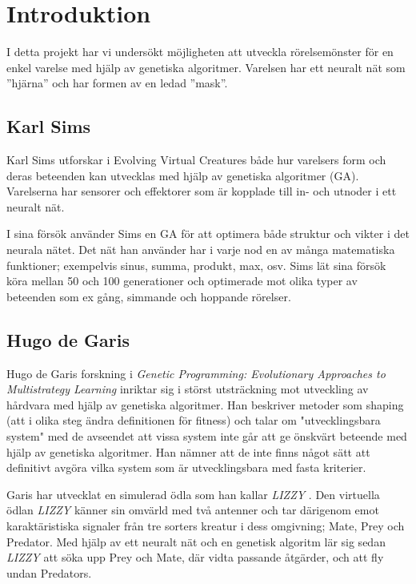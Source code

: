 \documentclass[titlepage, twocolumn, a4paper, 12pt, swedish]{article}
\begin{document}
\cleardoublepage
\newpage
\onecolumn
\tableofcontents
\cleardoublepage
\twocolumn
\cfoot{\thepage}


\section{Introduktion}

I detta projekt har vi undersökt möjligheten att utveckla rörelsemönster för en enkel varelse med hjälp av genetiska algoritmer. Varelsen har ett neuralt nät som ”hjärna” och har formen av en ledad ”mask”.

\subsection{Karl Sims}
Karl Sims utforskar i Evolving Virtual Creatures \cite{sims} både hur varelsers form och deras beteenden kan utvecklas med hjälp av genetiska algoritmer (GA). Varelserna har sensorer och effektorer som är kopplade till in- och utnoder i ett neuralt nät. 

I sina försök använder Sims en GA för att optimera både struktur och vikter i det neurala nätet. Det nät han använder har i varje nod en av många matematiska funktioner; exempelvis sinus, summa, produkt, max, osv. Sims lät sina försök köra mellan 50 och 100 generationer och optimerade mot olika typer av beteenden som ex gång, simmande och hoppande rörelser. 

\subsection{Hugo de Garis}
Hugo de Garis forskning i \textit{Genetic Programming: Evolutionary Approaches to Multistrategy Learning} \cite{garis} inriktar sig i störst utsträckning mot utveckling av hårdvara med hjälp av genetiska algoritmer. Han beskriver metoder som shaping (att i olika steg ändra definitionen för fitness) och talar om "utvecklingsbara system" med de avseendet att vissa system inte går att ge önskvärt beteende med hjälp av genetiska algoritmer. Han nämner att de inte finns något sätt att definitivt avgöra vilka system som är utvecklingsbara med fasta kriterier.

Garis har utvecklat en simulerad ödla som han kallar \textit{LIZZY} \cite{garis}. Den virtuella ödlan \textit{LIZZY} känner sin omvärld med två antenner och tar därigenom emot karaktäristiska signaler från tre sorters kreatur i dess omgivning; Mate, Prey och Predator. Med hjälp av ett neuralt nät och en genetisk algoritm lär sig sedan \textit{LIZZY} att söka upp Prey och Mate, där vidta passande åtgärder, och att fly undan Predators.
\end{document}
